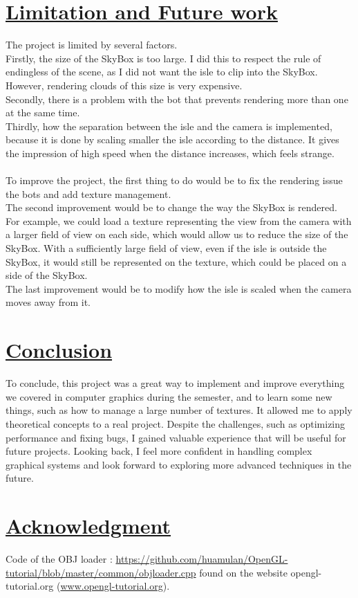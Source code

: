 \documentclass[acmtog,screen,review,nonacm]{acmart}
\begin{document}
\section{\underline{Limitation and Future work}}
The project is limited by several factors. 
\\
Firstly, the size of the SkyBox is too large. I did this to respect the rule of endingless of the scene, as I did not want the isle to clip into the SkyBox. However, rendering clouds of this size is very expensive.\\
Secondly, there is a problem with the bot that prevents rendering more than one at the same time. \\
Thirdly, how the separation between the isle and the camera is implemented, because it is done by scaling smaller the isle according to the distance. It gives the impression of high speed when the distance increases, which feels strange.
\\\\
To improve the project, the first thing to do would be to fix the rendering issue the bots and add texture management.
\\
The second improvement would be to change the way the SkyBox is rendered. For example, we could load a texture representing the view from the camera with a larger field of view on each side, which would allow us to reduce the size of the SkyBox. With a sufficiently large field of view, even if the isle is outside the SkyBox, it would still be represented on the texture, which could be placed on a side of the SkyBox.\\
The last improvement would be to modify how the isle is scaled when the camera moves away from it.
\\
\section{\underline{Conclusion}}
To conclude, this project was a great way to implement and improve everything we covered in computer graphics during the semester, and to learn some new things, such as how to manage a large number of textures. It allowed me to apply theoretical concepts to a real project. Despite the challenges, such as optimizing performance and fixing bugs, I gained valuable experience that will be useful for future projects. Looking back, I feel more confident in handling complex graphical systems and look forward to exploring more advanced techniques in the future.
\\
\section{\underline{Acknowledgment}}
Code of the OBJ loader : \url{https://github.com/huamulan/OpenGL-tutorial/blob/master/common/objloader.cpp} found on the website opengl-tutorial.org (\url{www.opengl-tutorial.org}).
\\
\end{document}
